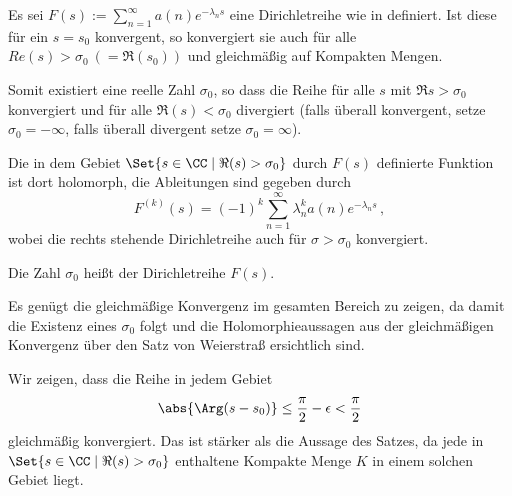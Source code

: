 \begin{satz}
	Es sei $F(s) := \sum_{n=1}^\infty a(n) e^{-\lambda_n s}$ eine Dirichletreihe wie in  definiert.
	Ist diese für ein $s = s_0$ konvergent, so konvergiert sie auch für alle $Re(s) > \sigma_0\ (= \Re(s_0))$ und gleichmäßig auf Kompakten Mengen.
	
	Somit existiert eine reelle Zahl $\sigma_0$, so dass die Reihe für alle $s$ mit $\Re s > \sigma_0$ konvergiert und für alle $\Re(s) < \sigma_0$ divergiert (falls überall konvergent, setze $\sigma_0 = -\infty$, falls überall divergent setze $\sigma_0 = \infty$).
	
	Die in dem Gebiet $\Set{s \in \CC \mid \Re(s) > \sigma_0}$ durch $F(s)$ definierte Funktion ist dort holomorph, die Ableitungen sind gegeben durch
	\[
		F^{(k)}(s) = (-1)^k \sum_{n=1}^\infty \lambda_n^k a(n) e^{-\lambda_n s}\,,
	\]
	wobei die rechts stehende Dirichletreihe auch für $\sigma > \sigma_0$ konvergiert.
	
	Die Zahl $\sigma_0$ heißt  der Dirichletreihe $F(s)$.
\end{satz}

\begin{bewe}
	Es genügt die gleichmäßige Konvergenz im gesamten Bereich zu zeigen, da damit die Existenz eines $\sigma_0$ folgt und die Holomorphieaussagen aus der gleichmäßigen Konvergenz über den Satz von Weierstraß ersichtlich sind.
	
	Wir zeigen, dass die Reihe in jedem Gebiet
	\[
		\abs{\Arg (s - s_0)} \leq \frac{\pi}{2} - \epsilon < \frac{\pi}{2}
	\]
	gleichmäßig konvergiert.
	Das ist stärker als die Aussage des Satzes, da jede in $\Set{s \in \CC \mid \Re(s) > \sigma_0}$ enthaltene Kompakte Menge $K$ in einem solchen Gebiet liegt.
\end{bewe}